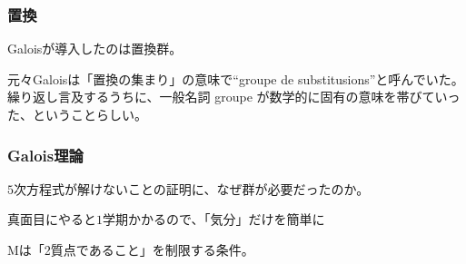 \documentclass[12pt, t]{beamer}
\begin{document}
\begin{frame}
\frametitle{置換}
Galoisが導入したのは置換群。

元々Galoisは「置換の集まり」の意味で``groupe de substitusions''と呼んでいた。
繰り返し言及するうちに、一般名詞 groupe が数学的に固有の意味を帯びていった、ということらしい\cite{Neumann2011}。

\end{frame}
\begin{frame}
\frametitle{Galois理論}
$5$次方程式が解けないことの証明に、なぜ群が必要だったのか。

真面目にやると$1$学期かかるので、「気分」だけを簡単に

\end{frame}

\begin{frame}
Mは「2質点であること」を制限する条件。

\end{frame}
\end{document}
